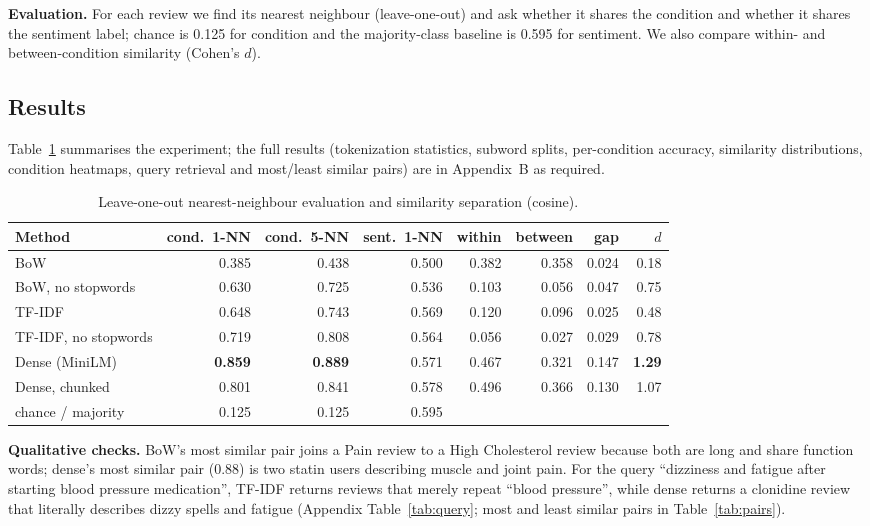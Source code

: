 \documentclass[11pt]{article}
\begin{document}
\textbf{Evaluation.} For each review we find its nearest neighbour (leave-one-out) and ask whether it shares the condition and whether it shares the sentiment label; chance is 0.125 for condition and the majority-class baseline is 0.595 for sentiment. We also compare within- and between-condition similarity (Cohen's $d$).

\subsection{Results}
Table~\ref{tab:eval} summarises the experiment; the full results (tokenization statistics, subword splits, per-condition accuracy, similarity distributions, condition heatmaps, query retrieval and most/least similar pairs) are in Appendix~B as required.

\begin{table}[H]\centering\small
\caption{Leave-one-out nearest-neighbour evaluation and similarity separation (cosine).}\label{tab:eval}
\begin{tabular}{lrrrrrrr}\toprule
Method & cond.\ 1-NN & cond.\ 5-NN & sent.\ 1-NN & within & between & gap & $d$ \\\midrule
BoW & 0.385 & 0.438 & 0.500 & 0.382 & 0.358 & 0.024 & 0.18 \\
BoW, no stopwords & 0.630 & 0.725 & 0.536 & 0.103 & 0.056 & 0.047 & 0.75 \\
TF-IDF & 0.648 & 0.743 & 0.569 & 0.120 & 0.096 & 0.025 & 0.48 \\
TF-IDF, no stopwords & 0.719 & 0.808 & 0.564 & 0.056 & 0.027 & 0.029 & 0.78 \\
Dense (MiniLM) & \textbf{0.859} & \textbf{0.889} & 0.571 & 0.467 & 0.321 & 0.147 & \textbf{1.29} \\
Dense, chunked & 0.801 & 0.841 & 0.578 & 0.496 & 0.366 & 0.130 & 1.07 \\
\midrule
chance / majority & 0.125 & 0.125 & 0.595 & & & & \\
\bottomrule\end{tabular}
\end{table}

\textbf{Qualitative checks.} BoW's most similar pair joins a Pain review to a High Cholesterol review because both are long and share function words; dense's most similar pair (0.88) is two statin users describing muscle and joint pain. For the query ``dizziness and fatigue after starting blood pressure medication'', TF-IDF returns reviews that merely repeat ``blood pressure'', while dense returns a clonidine review that literally describes dizzy spells and fatigue (Appendix Table~\ref{tab:query}; most and least similar pairs in Table~\ref{tab:pairs}).
\end{document}
